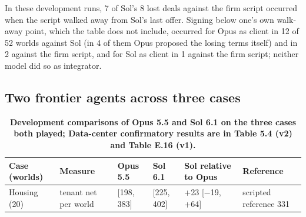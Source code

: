 In these development runs, 7 of Sol's 8 lost deals against the firm script occurred when the script walked away from
Sol's last offer. Signing below one's own walk-away point, which the table does not include, occurred for Opus as
client in 12 of 52 worlds against Sol (in 4 of them Opus proposed the losing terms itself) and in 2 against the firm
script, and for Sol as client in 1 against the firm script; neither model did so as integrator.

\subsection{Two frontier agents across three cases}\label{two-frontier-agents-across-three-cases}

\renewcommand{\thetable}{E.7}
\begin{longtable}[]{@{}
  >{\raggedright\arraybackslash}p{}
  >{\raggedright\arraybackslash}p{}
  >{\raggedleft\arraybackslash}p{}
  >{\raggedleft\arraybackslash}p{}
  >{\raggedleft\arraybackslash}p{}
  >{\raggedright\arraybackslash}p{}@{}}
\caption{\textbf{Development comparisons of Opus 5.5 and Sol 6.1 on the three cases both played; Data-center confirmatory results are in Table 5.4 (v2) and Table E.16 (v1).}}\label{tab:E.7}\tabularnewline
\toprule\noalign{}
\begin{minipage}[b]{\linewidth}\raggedright
Case (worlds)
\end{minipage} & \begin{minipage}[b]{\linewidth}\raggedright
Measure
\end{minipage} & \begin{minipage}[b]{\linewidth}\raggedleft
Opus 5.5
\end{minipage} & \begin{minipage}[b]{\linewidth}\raggedleft
Sol 6.1
\end{minipage} & \begin{minipage}[b]{\linewidth}\raggedleft
Sol relative to Opus
\end{minipage} & \begin{minipage}[b]{\linewidth}\raggedright
Reference
\end{minipage} \\
\midrule\noalign{}
\endhead
\bottomrule\noalign{}
\endlastfoot
Housing (20) & tenant net per world & 291 {[}198, 383{]} & 313 {[}225, 402{]} & +23 {[}−19, +64{]} & scripted reference 331 \\

\end{longtable}
